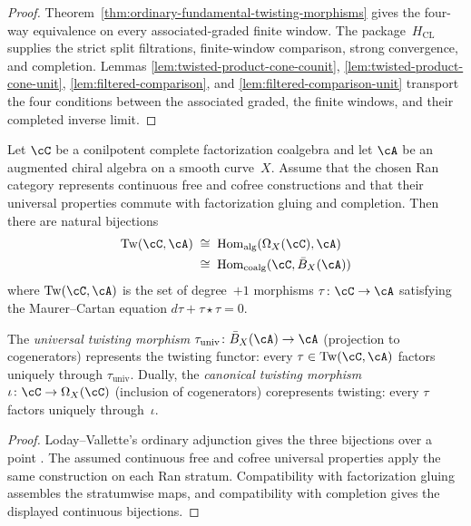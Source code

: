 \begin{proof}
Theorem~\ref{thm:ordinary-fundamental-twisting-morphisms} gives the
four-way equivalence on every associated-graded finite window.
The package~$H_{\mathrm{CL}}$ supplies the strict split filtrations,
finite-window comparison, strong convergence, and completion.  Lemmas
\ref{lem:twisted-product-cone-counit},
\ref{lem:twisted-product-cone-unit},
\ref{lem:filtered-comparison}, and
\ref{lem:filtered-comparison-unit} transport the four conditions
between the associated graded, the finite windows, and their completed
inverse limit.
\end{proof}
\begin{corollary}
\label{cor:three-bijections}
Let $\cC$ be a conilpotent complete factorization coalgebra and let
$\cA$ be an augmented chiral algebra on a smooth curve~$X$.  Assume
that the chosen Ran category represents continuous free and cofree
constructions and that their universal properties commute with
factorization gluing and completion.  Then
there are natural bijections
\begin{align}\label{eq:three-bijections}
\mathrm{Tw}(\cC, \cA)
&\;\cong\;
\operatorname{Hom}_{\mathrm{alg}}(\Omega_X(\cC), \cA)
\notag\\
&\;\cong\;
\operatorname{Hom}_{\mathrm{coalg}}(\cC, \bar{B}_X(\cA))
\end{align}
where\/ $\mathrm{Tw}(\cC, \cA)$ is the set of degree~$+1$
morphisms $\tau\colon \cC \to \cA$ satisfying the
Maurer--Cartan equation $d\tau + \tau \star \tau = 0$.

The \emph{universal twisting morphism}
$\tau_{\mathrm{univ}}\colon \bar{B}_X(\cA) \to \cA$
(projection to cogenerators) represents the twisting
functor: every $\tau \in \mathrm{Tw}(\cC, \cA)$
factors uniquely through $\tau_{\mathrm{univ}}$.
Dually, the \emph{canonical twisting morphism}
$\iota\colon \cC \to \Omega_X(\cC)$
(inclusion of cogenerators) corepresents
twisting: every $\tau$ factors uniquely through~$\iota$.
\end{corollary}

\begin{proof}
Loday--Vallette's ordinary adjunction gives the three bijections over
a point \cite[Theorem~2.2.9]{LodayVallette12}.  The assumed continuous
free and cofree universal properties apply the same construction on
each Ran stratum.  Compatibility with factorization gluing assembles
the stratumwise maps, and compatibility with completion gives the
displayed continuous bijections.
\end{proof}

